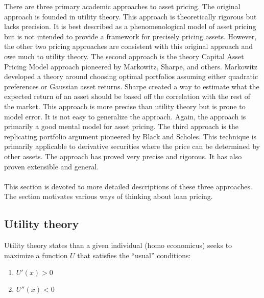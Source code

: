 \documentclass{article}
\theoremstyle{definition}
\begin{document}
There are three primary academic approaches to asset pricing.  The original approach is founded in utility theory.  This approach is theoretically rigorous but lacks precision.  It is best described as a phenomenological model of asset pricing but is not intended to provide a framework for precisely pricing assets.  However, the other two pricing approaches are consistent with this original approach and owe much to utility theory.  The second approach is the theory Capital Asset Pricing Model approach pioneered by Markowitz, Sharpe, and others.  Markowitz developed a theory around choosing optimal portfolios assuming either quadratic preferences or Gaussian asset returns.  Sharpe created a way to estimate what the expected return of an asset should be based off the correlation with the rest of the market.  This approach is more precise than utility theory but is prone to model error.  It is not easy to generalize the approach.  Again, the approach is primarily a good mental model for asset pricing.  The third approach is the replicating portfolio argument pioneered by Black and Scholes.  This technique is primarily applicable to derivative securities where the price can be determined by other assets.  The approach has proved very precise and rigorous.  It has also proven extensible and general.  
\\
\\
This section is devoted to more detailed descriptions of these three approaches.  The section motivates various ways of thinking about loan pricing.

\subsection{Utility theory}
Utility theory states than a given individual (homo economicus) seeks to maximize a function \(U\) that satisfies the ``usual'' conditions:
\begin{enumerate}
\item \(U'(x)>0\)
\item \(U''(x)<0\)
\end{enumerate}
\end{document}
